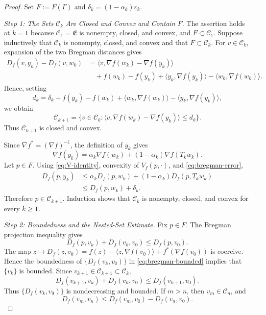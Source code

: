 \documentclass[10pt,a4paper]{amsart}
\newcommand{\C}{\mathscr{C}}
\newcommand{\E}{\mathfrak{E}}
\begin{document}
\begin{proof}
Set $F:=F(\Gamma)$ and $\delta_k=(1-\alpha_k)\varepsilon_k$.

\smallskip
\noindent\emph{Step 1: The Sets $\C_k$ Are Closed and Convex and Contain $F$.}
The assertion holds at $k=1$ because $\C_1=\E$ is nonempty, closed, and convex, and $F\subset\C_1$. Suppose inductively that $\C_k$ is nonempty, closed, and convex and that $F\subset\C_k$. For $v\in\C_k$, expansion of the two Bregman distances gives
\begin{align*}
 D_f(v,y_k)-D_f(v,w_k)
 &=\langle v,\nabla f(w_k)-\nabla f(y_k)\rangle\\
 &\quad+f(w_k)-f(y_k)
 +\langle y_k,\nabla f(y_k)\rangle
 -\langle w_k,\nabla f(w_k)\rangle.
\end{align*}
Hence, setting
\[
 d_k=\delta_k+f(y_k)-f(w_k)
 +\langle w_k,\nabla f(w_k)\rangle
 -\langle y_k,\nabla f(y_k)\rangle,
\]
we obtain
\begin{equation}\label{eq:bregman-halfspace}
 \C_{k+1}
 =\{v\in\C_k:\langle v,\nabla f(w_k)-\nabla f(y_k)\rangle\leq d_k\}.
\end{equation}
Thus $\C_{k+1}$ is closed and convex.

Since $\nabla f^*=(\nabla f)^{-1}$, the definition of $y_k$ gives
\[
 \nabla f(y_k)
 =\alpha_k\nabla f(w_k)+(1-\alpha_k)\nabla f(T_kw_k).
\]
Let $p\in F$. Using \eqref{eq:V-identity}, convexity of $V_f(p,\cdot)$, and \eqref{eq:bregman-error},
\begin{align*}
 D_f(p,y_k)
 &\leq \alpha_kD_f(p,w_k)+(1-\alpha_k)D_f(p,T_kw_k)\\
 &\leq D_f(p,w_k)+\delta_k.
\end{align*}
Therefore $p\in\C_{k+1}$. Induction shows that $\C_k$ is nonempty, closed, and convex for every $k\geq1$.

\smallskip
\noindent\emph{Step 2: Boundedness and the Nested-Set Estimate.}
Fix $p\in F$. The Bregman projection inequality gives
\begin{equation}\label{eq:bregman-bounded}
 D_f(p,v_k)+D_f(v_k,v_0)\leq D_f(p,v_0).
\end{equation}
The map $z\mapsto D_f(z,v_0)=f(z)-\langle z,\nabla f(v_0)\rangle+f^*(\nabla f(v_0))$ is coercive. Hence the boundedness of $\{D_f(v_k,v_0)\}$ in \eqref{eq:bregman-bounded} implies that $\{v_k\}$ is bounded. Since $v_{k+1}\in\C_{k+1}\subset\C_k$,
\[
 D_f(v_{k+1},v_k)+D_f(v_k,v_0)\leq D_f(v_{k+1},v_0).
\]
Thus $\{D_f(v_k,v_0)\}$ is nondecreasing and bounded. If $m>n$, then $v_m\in\C_n$, and
\begin{equation}\label{eq:bregman-nested}
 D_f(v_m,v_n)
 \leq D_f(v_m,v_0)-D_f(v_n,v_0).
\end{equation}


\end{proof}
\end{document}
